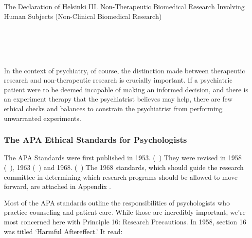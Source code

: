 \begin{refsection}
\begin{apatextbox}{The Declaration of Helsinki}
III. Non-Therapeutic Biomedical Research Involving Human Subjects (Non-Clinical Biomedical Research) \\

\\

\\

\\

\\

 \end{apatextbox}

In the context of psychiatry, of course, the distinction made between therapeutic research and non-therapeutic research is crucially important. If a psychiatric patient were to be deemed incapable of making an informed decision, and there is an experiment therapy that the psychiatrist believes may help, there are few ethical checks and balances to constrain the psychiatrist from performing unwarranted experiments.

\subsubsection{The APA Ethical Standards for Psychologists}
\label{theapaethicalstandardsforpsychologists}

The APA Standards were first published in 1953. (~\citep{Association:71thM4UP}) They were revised in 1958 (~\citep{Association:1958tg}), 1963 (~\citep{Association:1963uu}) and 1968. (~\citep{Association:1968uu}) The 1968 standards, which should guide the research committee in determining which research programs should be allowed to move forward, are attached in Appendix .

Most of the APA standards outline the responsibilities of psychologists who practice counseling and patient care. While those are incredibly important, we're most concerned here with Principle 16: Research Precautions. In 1958, section 16 was titled `Harmful Aftereffect.' It read:


\end{refsection}
